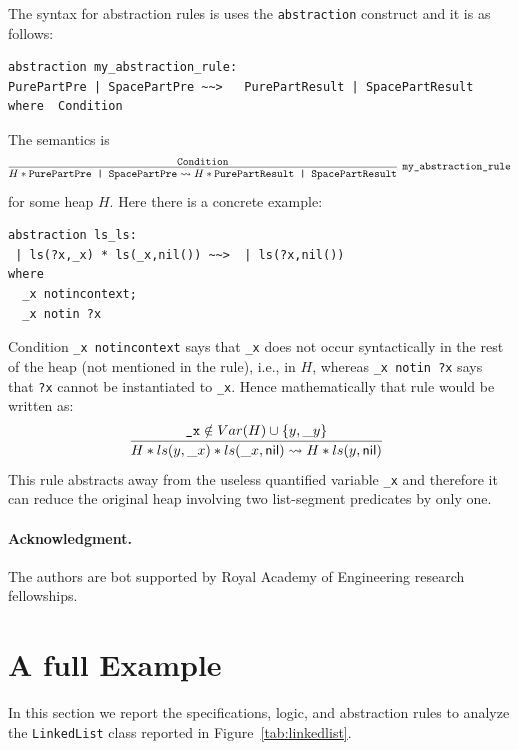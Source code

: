 \documentclass[11pt]{article}
\newcommand{\nil}{{\sf nil}}
\begin{document}
The syntax for abstraction rules is uses the {\tt abstraction} construct and it is as follows:
\begin{verbatim}
abstraction my_abstraction_rule:
PurePartPre | SpacePartPre ~~>   PurePartResult | SpacePartResult    
where  Condition
\end{verbatim}
The semantics  is
\[
\infer[\texttt{my\_abstraction\_rule}]
{H* \texttt{PurePartPre | SpacePartPre} \leadsto H*\texttt{PurePartResult | SpacePartResult} }{\texttt{Condition}}
\] for some heap $H$. Here there is a concrete example:
\begin{verbatim}
abstraction ls_ls:
 | ls(?x,_x) * ls(_x,nil()) ~~>  | ls(?x,nil())
where 
  _x notincontext;
  _x notin ?x
\end{verbatim}
Condition {\tt \_x notincontext} says that {\tt \_x} does not occur syntactically in the rest of the heap (not mentioned in the rule), i.e., in $H$, whereas {\tt \_x notin ?x} says that {\tt ?x} cannot be instantiated to {\tt \_x}. Hence mathematically that rule would be written as:
\[
\infer[]
{H*ls(y,\_x)*ls(\_x,\nil) \leadsto H*ls(y,\nil)}
{\texttt{\_x} \notin Var(H) \cup \{y,\_y \} }
\] This rule abstracts away from the useless quantified variable {\tt \_x} and therefore it can reduce the original heap involving two list-segment predicates by only one.

\paragraph{Acknowledgment.}
The authors are bot supported by Royal Academy of Engineering research fellowships.




\appendix 
\section{A full Example}
In this section we report the specifications, logic, and abstraction rules to analyze the {\tt LinkedList} class
 reported in Figure~\ref{tab:linkedlist}.
\end{document}
